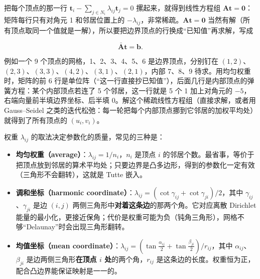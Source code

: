 把每个顶点的那一行 $\mathbf{t}_i - \sum_{j\in N_i}\lambda_{ij}\mathbf{t}_j = 0$ 摞起来，就得到线性方程组 $\mathbf{A}\mathbf{t} = \mathbf{0}$：矩阵每行只有对角元 1 和邻居位置上的 $-\lambda_{ij}$，非常稀疏。$\mathbf{A}\mathbf{t} = \mathbf{0}$ 当然有解（所有顶点取同一个值就是一解），所以要把边界顶点的行换成“已知值”再求解，写成

\[
\bar{\mathbf{A}}\mathbf{t} = \mathbf{b}.
\]

例如一个 9 个顶点的网格，1、2、3、4、5、6 是边界顶点，分别钉在 $(1,2)$、$(2,3)$、$(3,3)$、$(4,2)$、$(3,1)$、$(2,1)$，内部 7、8、9 待求。用均匀权重时，矩阵的前 6 行是单位阵（“这一行直接抄已知值”），后面几行是内部顶点的弹簧方程：某个内部顶点若连了 5 个邻居，这一行就是 5 个 1 加上对角元的 $-5$，右端向量前半填边界坐标、后半填 0。解这个稀疏线性方程组（直接求解，或者用 Gauss–Seidel 之类的迭代松弛：每一轮把每个内部顶点挪到它邻居的加权平均处）就得到了所有顶点的 $(u_i, v_i)$。

权重 $\lambda_{ij}$ 的取法决定参数化的质量，常见的三种是：

\begin{itemize}[nosep]
    \item \textbf{均匀权重（average）}：$\lambda_{ij} = 1/n_i$，$n_i$ 是顶点 $i$ 的邻居个数。最省事，等价于把顶点放到邻居的算术平均处；只要边界是凸多边形，得到的参数化一定有效（三角形不会翻转），这就是 Tutte 嵌入。
    \item \textbf{调和坐标（harmonic coordinate）}：$\lambda_{ij} = (\cot\gamma_{ij} + \cot\gamma_{ji})/2$，其中 $\gamma_{ij}$、$\gamma_{ji}$ 是边 $(i,j)$ 两侧三角形中\textbf{对着这条边}的那两个角。它对应离散 Dirichlet 能量的最小化，更接近保角；代价是权重可能为负（钝角三角形），网格不够“Delaunay”时会出现三角形翻转。
    \item \textbf{均值坐标（mean coordinate）}：$\lambda_{ij} = \left(\tan\frac{\alpha_{ij}}{2} + \tan\frac{\beta_{ji}}{2}\right)\big/r_{ij}$，其中 $\alpha_{ij}$、$\beta_{ji}$ 是边两侧三角形\textbf{在顶点 $i$ 处}的两个角，$r_{ij}$ 是这条边的长度。权重恒为正，配合凸边界能保证映射是一一的。
\end{itemize}


\appendix


